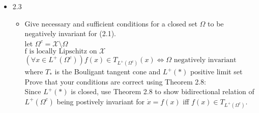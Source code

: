 \documentclass[12pt,letter]{article}
\newcommand{\R}{\mathbb{R}}
\begin{document}
\begin{itemize}
\begin{itemize}
  

  
  \end{itemize}

  
\item 2.3
  \begin{itemize}
    \item Give necessary and sufficient conditions for a closed set $\Omega$ to be negatively invariant for (2.1).\\

      let $\Omega^c=\mathcal{X} \setminus \Omega$\\
      $\text{f is locally Lipschitz on }\mathcal{X}$\\
      $(\forall x \in L^+(\Omega^c)) f(x) \in T_{L^+(\Omega^c)}(x) \iff \Omega \text{ negatively invariant}$\\
      where $T_{*}$ is the Bouligant tangent cone and $L^+(*)$ positive limit set\\

      Prove that your conditions are correct using Theorem 2.8:\\

      Since $L^+(*)$ is closed, use Theorem 2.8 to show bidirectional relation of $L^+(\Omega^c)$ being postively invariant for $\dot{x}=f(x)$ iff $f(x) \in T_{L^+(\Omega^c)}$.\\


\end{itemize}
\end{itemize}
\end{document}
